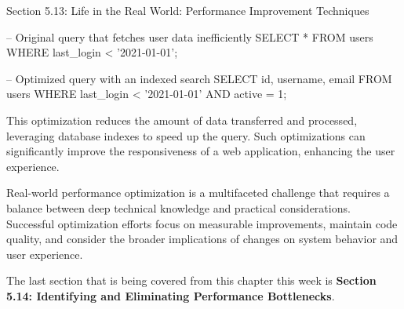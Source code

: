 \begin{notes}{Section 5.13: Life in the Real World: Performance Improvement Techniques}
\begin{highlight}
    \begin{code}[SQL]
    -- Original query that fetches user data inefficiently
    SELECT * FROM users WHERE last_login < '2021-01-01';
    
    -- Optimized query with an indexed search
    SELECT id, username, email FROM users WHERE last_login < '2021-01-01' AND active = 1;
    \end{code}
    
        This optimization reduces the amount of data transferred and processed, leveraging database indexes to speed up the query. Such optimizations can significantly improve the responsiveness of a 
        web application, enhancing the user experience.
    \end{highlight}
    
    Real-world performance optimization is a multifaceted challenge that requires a balance between deep technical knowledge and practical considerations. Successful optimization efforts focus on 
    measurable improvements, maintain code quality, and consider the broader implications of changes on system behavior and user experience.    
\end{notes}

The last section that is being covered from this chapter this week is \textbf{Section 5.14: Identifying and Eliminating Performance Bottlenecks}.

